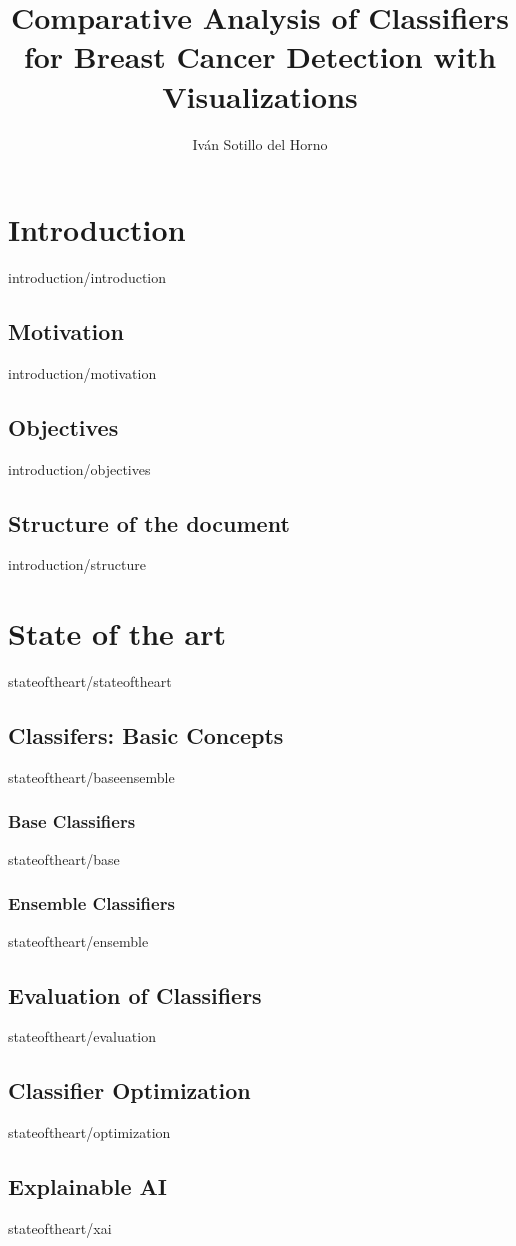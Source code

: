 \documentclass[covers, firstnumbered, tfg, extendedindex, epsbased, english, final]{tfgtfmthesisuam}
\title{Comparative Analysis of Classifiers for Breast Cancer Detection with Visualizations}
\author{Iván Sotillo del Horno}
\begin{document}
\chapter{Introduction\label{CAP:INTRODUCTION}}{introduction/introduction}
\section{Motivation}{introduction/motivation}
\section{Objectives}{introduction/objectives}
\section{Structure of the document}{introduction/structure}

\chapter{State of the art}{stateoftheart/stateoftheart}
\section{Classifers: Basic Concepts\label{SEC:BASEENSEMBLE}}{stateoftheart/baseensemble}
\subsection{Base Classifiers}{stateoftheart/base}
\subsection{Ensemble Classifiers}{stateoftheart/ensemble}
\section{Evaluation of Classifiers\label{SEC:EVALUATION}}{stateoftheart/evaluation}
\section{Classifier Optimization\label{SEC:OPTIMIZATION}}{stateoftheart/optimization}

\section{Explainable AI}{stateoftheart/xai}
\end{document}
